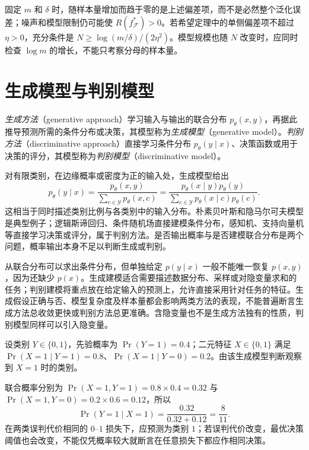 固定 $m$ 和 $\delta$ 时，随样本量增加而趋于零的是上述偏差项，而不是必然整个泛化误差；噪声和模型限制仍可能使 $R(f_{\mathcal F}^*)>0$。若希望定理中的单侧偏差项不超过 $\eta>0$，充分条件是 $N\geq\log(m/\delta)/(2\eta^2)$。模型规模也随 $N$ 改变时，应同时检查 $\log m$ 的增长，不能只考察分母的样本量。

\section{生成模型与判别模型}
\label{sec:lh-generative-discriminative}

\begin{definition}
\label{def:lh-generative-discriminative}
\emph{生成方法}（generative approach）学习输入与输出的联合分布 $p_\theta(x,y)$，再据此推导预测所需的条件分布或决策，其模型称为\emph{生成模型}（generative model）。\emph{判别方法}（discriminative approach）直接学习条件分布 $p_\theta(y\mid x)$、决策函数或用于决策的评分，其模型称为\emph{判别模型}（discriminative model）。
\end{definition}

对有限类别，在边缘概率或密度为正的输入处，生成模型给出
\begin{equation}
    p_\theta(y\mid x)
       =\frac{p_\theta(x,y)}{\sum_{c\in\mathcal Y}p_\theta(x,c)}
       =\frac{p_\theta(x\mid y)p_\theta(y)}
          {\sum_{c\in\mathcal Y}p_\theta(x\mid c)p_\theta(c)}.
    \label{eq:lh-generative-posterior}
\end{equation}
这相当于同时描述类别比例与各类别中的输入分布。朴素贝叶斯和隐马尔可夫模型是典型例子；逻辑斯谛回归、条件随机场直接建模条件分布，感知机、支持向量机等直接学习决策或评分，属于判别方法。是否输出概率与是否建模联合分布是两个问题，概率输出本身不足以判断生成或判别。

从联合分布可以求出条件分布，但单独给定 $p(y\mid x)$ 一般不能唯一恢复 $p(x,y)$，因为还缺少 $p(x)$。生成建模适合需要描述数据分布、采样或对隐变量求和的任务；判别建模将重点放在给定输入的预测上，允许直接采用针对任务的特征。生成假设正确与否、模型复杂度及样本量都会影响两类方法的表现，不能普遍断言生成方法总收敛更快或判别方法总更准确。含隐变量也不是生成方法独有的性质，判别模型同样可以引入隐变量。

\begin{example}
\label{ex:lh-generative-binary}
设类别 $Y\in\{0,1\}$，先验概率为 $\Pr(Y=1)=0.4$；二元特征 $X\in\{0,1\}$ 满足 $\Pr(X=1\mid Y=1)=0.8$、$\Pr(X=1\mid Y=0)=0.2$。由该生成模型判断观察到 $X=1$ 时的类别。
\end{example}
\begin{solve}
联合概率分别为 $\Pr(X=1,Y=1)=0.8\times0.4=0.32$ 与 $\Pr(X=1,Y=0)=0.2\times0.6=0.12$，所以
\[
    \Pr(Y=1\mid X=1)=\frac{0.32}{0.32+0.12}=\frac8{11}.
\]
在两类误判代价相同的 $0$--$1$ 损失下，应预测为类别 $1$；若误判代价改变，最优决策阈值也会改变，不能仅凭概率较大就断言在任意损失下都应作相同决策。
\end{solve}

